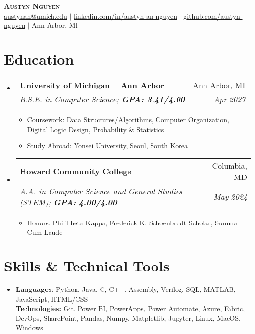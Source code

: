\documentclass[letterpaper,11pt]{article}
\makeatletter
\newcommand{\resumeItem}[1]{\item[\textopenbullet]\small{#1 \vspace{-2pt}}}
\newcommand{\resumeSubheading}[4]{
  \vspace{-2pt}\item
  \begin{tabular*}{0.97\textwidth}[t]{l@{\extracolsep{\fill}}r}
    \textbf{#1} & #2 \\
    \textit{\small#3} & \textit{\small #4} \\
  \end{tabular*}\vspace{-7pt}
}
\newcommand{\resumeSubHeadingListStart}{\begin{itemize}[leftmargin=0.15in, label={}]}
\newcommand{\resumeSubHeadingListEnd}{\end{itemize}}
\newcommand{\resumeItemListStart}{\begin{itemize}[leftmargin=0.2in, label=\textopenbullet]}
\newcommand{\resumeItemListEnd}{\end{itemize}\vspace{-5pt}}
\makeatother
\begin{document}
\begin{center}
  \textbf{\Huge \scshape Austyn Nguyen} \\ \vspace{3pt}
  \small
  \faEnvelope \hspace{.5pt} \href{mailto:austynan@umich.edu}{austynan@umich.edu}
  $|$
  \faLinkedinSquare \hspace{.5pt} \href{https://www.linkedin.com/in/austyn-an-nguyen}{linkedin.com/in/austyn-an-nguyen}
  $|$
  \faGithub \hspace{.5pt} \href{https://github.com/austyn-nguyen}{github.com/austyn-nguyen}
  $|$
  \faMapMarker \hspace{.5pt} Ann Arbor, MI
\end{center}

\section{Education}
\resumeSubHeadingListStart
  \resumeSubheading
    {University of Michigan -- Ann Arbor}{Ann Arbor, MI}
    {B.S.E. in Computer Science; \textbf{GPA: 3.41/4.00}}{Apr 2027}
    \resumeItemListStart
      \resumeItem{Coursework: Data Structures/Algorithms, Computer Organization, Digital Logic Design, Probability \& Statistics}
      \resumeItem{Study Abroad: Yonsei University, Seoul, South Korea}
    \resumeItemListEnd

  \resumeSubheading
    {Howard Community College}{Columbia, MD}
    {A.A. in Computer Science and General Studies (STEM); \textbf{GPA: 4.00/4.00}}{May 2024}
    \resumeItemListStart
        \resumeItem{Honors: Phi Theta Kappa, Frederick K. Schoenbrodt Scholar, Summa Cum Laude}
    \resumeItemListEnd
\resumeSubHeadingListEnd

\section{Skills \& Technical Tools}
\resumeSubHeadingListStart
  \item{
    \textbf{Languages:} Python, Java, C, C++, Assembly, Verilog, SQL, MATLAB, JavaScript, HTML/CSS \\
    \textbf{Technologies:} Git, Power BI, PowerApps, Power Automate, Azure, Fabric, DevOps, SharePoint, Pandas, Numpy, Matplotlib, Jupyter, Linux, MacOS, Windows
  }
\resumeSubHeadingListEnd

\end{document}
